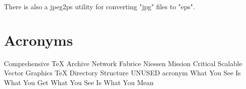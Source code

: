 \documentclass{mcreport}
\begin{document}
There is also a jpeg2ps utility for converting "jpg" files to "eps".


\section{Acronyms}
\label{sec:acronyms}


\begin{mcnormalspacing}
\begin{acronym}[WYSIWYMX]
        {Comprehensive \TeX{} Archive Network}
         {Fabrice Niessen}
          {Mission Critical}
         {Scalable Vector Graphics}
         {\TeX{} Directory Structure}
      {UNUSED acronym}
     {What You See Is What You Get}
     {What You See Is What You Mean}
\end{acronym}
\end{mcnormalspacing}
\end{document}
